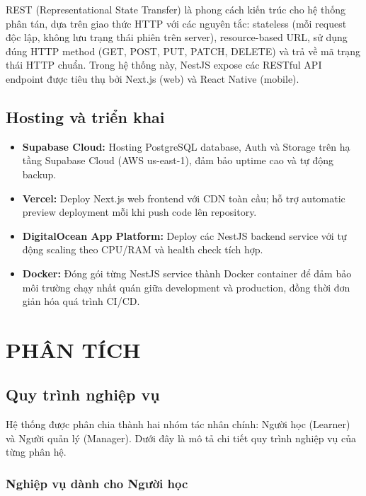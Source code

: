 \documentclass[a4paper,12pt]{extreport}
\begin{document}
REST (Representational State Transfer) là phong cách kiến trúc cho hệ thống phân tán, dựa trên giao thức HTTP với các nguyên tắc: stateless (mỗi request độc lập, không lưu trạng thái phiên trên server), resource-based URL, sử dụng đúng HTTP method (GET, POST, PUT, PATCH, DELETE) và trả về mã trạng thái HTTP chuẩn. Trong hệ thống này, NestJS expose các RESTful API endpoint được tiêu thụ bởi Next.js (web) và React Native (mobile).

\section{Hosting và triển khai}

\begin{itemize}
    \item \textbf{Supabase Cloud:} Hosting PostgreSQL database, Auth và Storage trên hạ tầng Supabase Cloud (AWS us-east-1), đảm bảo uptime cao và tự động backup.
    \item \textbf{Vercel:} Deploy Next.js web frontend với CDN toàn cầu; hỗ trợ automatic preview deployment mỗi khi push code lên repository.
    \item \textbf{DigitalOcean App Platform:} Deploy các NestJS backend service với tự động scaling theo CPU/RAM và health check tích hợp.
    \item \textbf{Docker:} Đóng gói từng NestJS service thành Docker container để đảm bảo môi trường chạy nhất quán giữa development và production, đồng thời đơn giản hóa quá trình CI/CD.
\end{itemize}

\chapter{PHÂN TÍCH}

\section{Quy trình nghiệp vụ}
Hệ thống được phân chia thành hai nhóm tác nhân chính: Người học (Learner) và Người quản lý (Manager). Dưới đây là mô tả chi tiết quy trình nghiệp vụ của từng phân hệ.

\subsection{Nghiệp vụ dành cho Người học}
\end{document}

